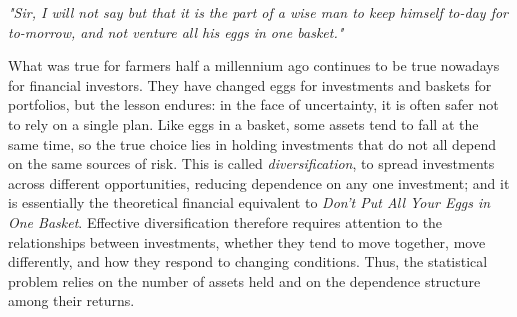 \documentclass[12pt]{report} %
\begin{document}

\textit{"Sir, I will not say but that it is the part of a wise man to keep himself to-day 
for to-morrow, and not venture all his eggs in one basket."}

What was true for farmers half a millennium ago continues to be true nowadays for 
financial investors. They have changed eggs for investments and baskets for portfolios, 
but the lesson endures: in the face of uncertainty, it is often safer not to rely on a 
single plan. Like eggs in a basket, some assets tend to fall at the same time, so the true 
choice lies in holding investments that do not all depend on the same sources of risk. This 
is called \textit{diversification}, to spread investments across different opportunities, 
reducing dependence on any one investment; and it is essentially the theoretical financial 
equivalent to \textit{Don’t Put All Your Eggs in One Basket}. Effective diversification 
therefore requires attention to the relationships between investments, whether they tend to 
move together, move differently, and how they respond to changing conditions.
Thus, the statistical problem relies on the number of assets held and on 
the dependence structure among their returns.
\end{document}
